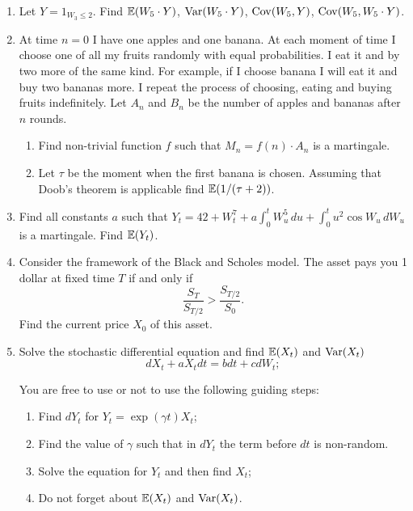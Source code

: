 \documentclass[12pt, a4paper]{article}
\begin{document}
\begin{enumerate}


\item Let $Y = 1_{W_3 \leq 2}$. Find $\operatorname{\mathbb{E}}(W_5 \cdot Y)$, $\operatorname{Var}(W_5 \cdot Y)$, $\operatorname{Cov}(W_5, Y)$, $\operatorname{Cov}(W_5, W_5 \cdot Y)$.

\item At time $n=0$ I have one apples and one banana. At each moment of time I choose one of all my fruits randomly with equal probabilities. I eat it and by two more of the same kind. For example, if I choose banana I will eat it and buy two bananas more. I repeat the process of choosing, eating and buying fruits indefinitely. Let $A_n$ and $B_n$ be the number of apples and bananas after $n$ rounds.

\begin{enumerate}
  \item Find non-trivial function $f$ such that $M_n = f(n) \cdot A_n$ is a martingale.
  \item Let $\tau$ be the moment when the first banana is chosen. Assuming that Doob's theorem is applicable find $\operatorname{\mathbb{E}}(1/(\tau + 2))$.
\end{enumerate}


\item Find all constants $a$ such that $Y_t = 42 + W_t^7 + a\int_0^t W_u^5 \, du + \int_0^t u^2 \cos W_u \, dW_u$ is a martingale. Find $\operatorname{\mathbb{E}}(Y_t)$.

\item Consider the framework of the Black and Scholes model. The asset pays you 1 dollar at fixed time $T$ if and only if
\[
\frac{S_T}{S_{T/2}} > \frac{S_{T/2}}{S_0}.
\]
Find the current price $X_0$ of this asset.


\item Solve the stochastic differential equation and find $\operatorname{\mathbb{E}}(X_t)$ and $\operatorname{Var}(X_t)$
\[
dX_t + aX_t dt = b dt + c dW_t;
\]

You are free to use or not to use the following guiding steps:

\begin{enumerate}
  \item Find $dY_t$ for $Y_t = \exp(\gamma t)X_t$;
  \item Find the value of $\gamma$ such that in $dY_t$ the term before $dt$ is non-random.
  \item Solve the equation for $Y_t$ and then find $X_t$;
  \item Do not forget about $\operatorname{\mathbb{E}}(X_t)$ and $\operatorname{Var}(X_t)$.
\end{enumerate}

\end{enumerate}
\end{document}
